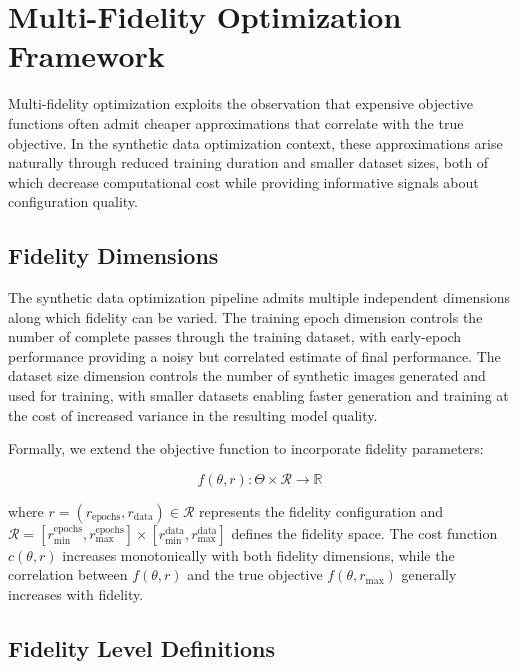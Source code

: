 \section{Multi-Fidelity Optimization Framework}
\label{sec:multi_fidelity_framework}

Multi-fidelity optimization exploits the observation that expensive objective functions often admit cheaper approximations that correlate with the true objective. In the synthetic data optimization context, these approximations arise naturally through reduced training duration and smaller dataset sizes, both of which decrease computational cost while providing informative signals about configuration quality.

\subsection{Fidelity Dimensions}

The synthetic data optimization pipeline admits multiple independent dimensions along which fidelity can be varied. The training epoch dimension controls the number of complete passes through the training dataset, with early-epoch performance providing a noisy but correlated estimate of final performance. The dataset size dimension controls the number of synthetic images generated and used for training, with smaller datasets enabling faster generation and training at the cost of increased variance in the resulting model quality.

Formally, we extend the objective function to incorporate fidelity parameters:

\begin{equation}
f(\theta, r) : \Theta \times \mathcal{R} \rightarrow \mathbb{R}
\label{eq:multi_fidelity_objective}
\end{equation}

where $r = (r_{\text{epochs}}, r_{\text{data}}) \in \mathcal{R}$ represents the fidelity configuration and $\mathcal{R} = [r_{\min}^{\text{epochs}}, r_{\max}^{\text{epochs}}] \times [r_{\min}^{\text{data}}, r_{\max}^{\text{data}}]$ defines the fidelity space. The cost function $c(\theta, r)$ increases monotonically with both fidelity dimensions, while the correlation between $f(\theta, r)$ and the true objective $f(\theta, r_{\max})$ generally increases with fidelity.

\subsection{Fidelity Level Definitions}


